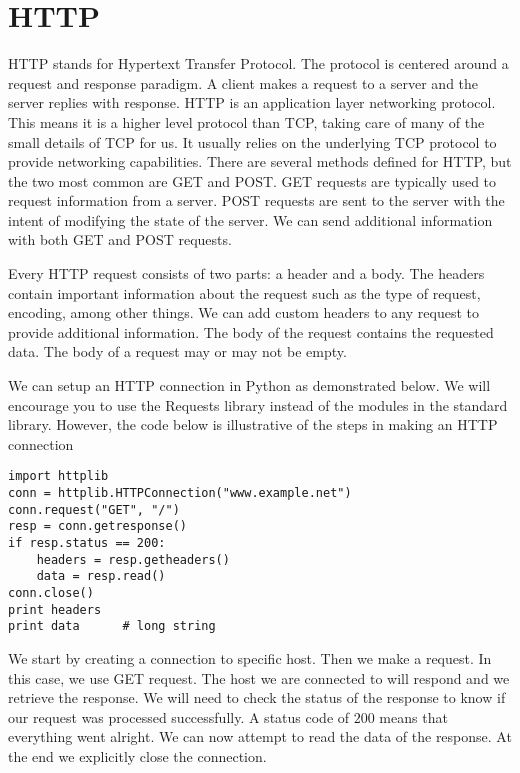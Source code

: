 %

%


\section*{HTTP}
HTTP stands for Hypertext Transfer Protocol.
The protocol is centered around a request and response paradigm.
A client makes a request to a server and the server replies with response.
HTTP is an application layer networking protocol.
This means it is a higher level protocol than TCP, taking care of many of the small details of TCP for us.
It usually relies on the underlying TCP protocol to provide networking capabilities.
There are several methods defined for HTTP, but the two most common are GET and POST.
GET requests are typically used to request information from a server.
POST requests are sent to the server with the intent of modifying the state of the server.  We can send additional information with both GET and POST requests.

Every HTTP request consists of two parts: a header and a body.
The headers contain important information about the request such as the type of request, encoding, among other things.
We can add custom headers to any request to provide additional information.
The body of the request contains the requested data.
The body of a request may or may not be empty.

We can setup an HTTP connection in Python as demonstrated below.
We will encourage you to use the Requests library instead of the modules in the standard library.
However, the code below is illustrative of the steps in making an HTTP connection
\begin{lstlisting}
import httplib
conn = httplib.HTTPConnection("www.example.net")
conn.request("GET", "/")
resp = conn.getresponse()
if resp.status == 200:
    headers = resp.getheaders()
    data = resp.read()
conn.close()
print headers
print data      # long string
\end{lstlisting}
We start by creating a connection to specific host.
Then we make a request.  In this case, we use GET request.
The host we are connected to will respond and we retrieve the response.
We will need to check the status of the response to know if our request was processed successfully.
A status code of $200$ means that everything went alright.
We can now attempt to read the data of the response.
At the end we explicitly close the connection.

